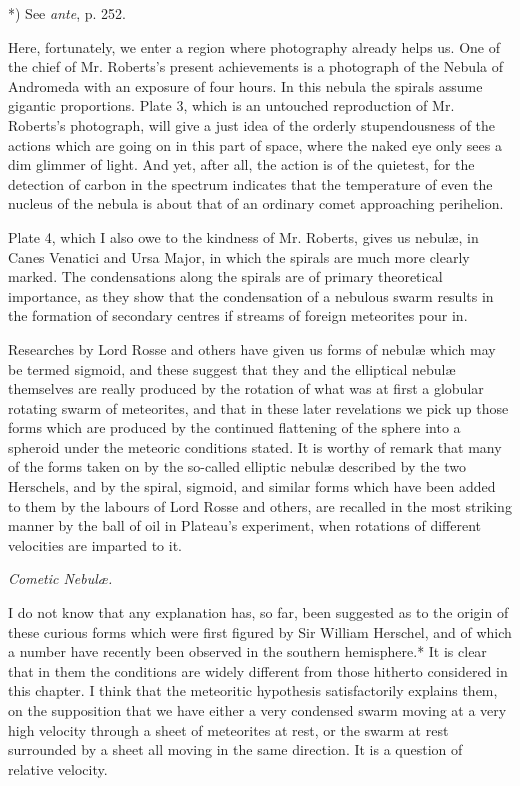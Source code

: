 \documentclass[a4paper, 12pt, oneside, polutonikogreek, english]{article}
\begin{document}
*) See \emph{ante}, p. 252.

Here, fortunately, we enter a region where photography already helps us. One of the chief of Mr. Roberts's present achievements is a photograph of the Nebula of Andromeda with an exposure of four hours. In this nebula the spirals assume gigantic proportions. Plate 3, which is an untouched reproduction of Mr. Roberts's photograph, will give a just idea of the orderly stupendousness of the actions which are going on in this part of space, where the naked eye only sees a dim glimmer of light. And yet, after all, the action is of the quietest, for the detection of carbon in the spectrum indicates that the temperature of even the nucleus of the nebula is about that of an ordinary comet approaching perihelion.

Plate 4, which I also owe to the kindness of Mr. Roberts, gives us nebulæ, in Canes Venatici and Ursa Major, in which the spirals are much more clearly marked. The condensations along the spirals are of primary theoretical importance, as they show that the condensation of a nebulous swarm results in the formation of secondary centres if streams of foreign meteorites pour in.

Researches by Lord Rosse and others have given us forms of nebulæ which may be termed sigmoid, and these suggest that they and the elliptical nebulæ themselves are really produced by the rotation of what was at first a globular rotating swarm of meteorites, and that in these later revelations we pick up those forms which are produced by the continued flattening of the sphere into a spheroid under the meteoric conditions stated. It is worthy of remark that many of the forms taken on by the so-called elliptic nebulæ described by the two Herschels, and by the spiral, sigmoid, and similar forms which have been added to them by the labours of Lord Rosse and others, are recalled in the most striking manner by the ball of oil in Plateau's experiment, when rotations of different velocities are imparted to it.

\emph{Cometic Nebulæ.}

I do not know that any explanation has, so far, been suggested as to the origin of these curious forms which were first figured by Sir William Herschel, and of which a number have recently been observed in the southern hemisphere.* It is clear that in them the conditions are widely different from those hitherto considered in this chapter. I think that the meteoritic hypothesis satisfactorily explains them, on the supposition that we have either a very condensed swarm moving at a very high velocity through a sheet of meteorites at rest, or the swarm at rest surrounded by a sheet all moving in the same direction. It is a question of relative velocity.
\end{document}
